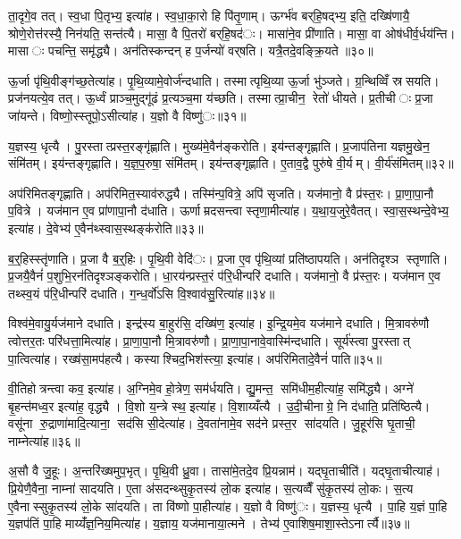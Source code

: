 ता॒दृगे॒व तत्। स्व॒धा पि॒तृभ्य॒ इत्या॑ह। स्व॒धा॒का॒रो हि पि॑तृ॒णाम्। ऊर्ग्भ॑व बर्‌हि॒षद्भ्य॒ इति॒ दख्षि॑णायै॒ श्रोणे॒रोत्त॑रस्यै॒ निन॑यति॒ सन्त॑त्यै। मासा॒ वै पि॒तरो॑ बर्‌हि॒षद॑ः। मासा॑ने॒व प्री॑णाति। मासा॒ वा ओष॑धीर्व॒र्धय॑न्ति। मासाः पचन्ति॒ समृ॑द्ध्यै। अन॑तिस्कन्दन् ह प॒र्जन्यो॑ वर्‌षति। यत्रै॒तदे॒वङ्क्रि॒यते॥३०॥

ऊ॒र्जा पृ॑थि॒वीङ्ग॑च्छ॒तेत्या॑ह। पृ॒थि॒व्यामे॒वोर्ज॑न्दधाति। तस्मात्पृथि॒व्या ऊ॒र्जा भु॑ञ्जते। ग्र॒न्थिव्विँ स्रसयति। प्रज॑नयत्ये॒व तत्। ऊ॒र्ध्वं प्राञ्च॒मुद्गू॑ढं प्र॒त्यञ्च॒मा य॑च्छति। तस्मात्प्रा॒चीन॒ रेतो॑ धीयते। प्र॒तीचीः प्र॒जा जा॑यन्ते। विष्णो॒स्स्तूपो॒ऽसीत्या॑ह। य॒ज्ञो वै विष्णु॑ः॥३१॥

य॒ज्ञस्य॒ धृत्यै। पु॒रस्तात्प्रस्त॒रङ्गृ॑ह्णाति। मुख्य॑मे॒वैन॑ङ्करोति। इय॑न्तङ्गृह्णाति। प्र॒जाप॑तिना यज्ञमु॒खेन॒ संमि॑तम्। इय॑न्तङ्गृह्णाति। य॒ज्ञ॒प॒रुषा॒ संमि॑तम्। इय॑न्तङ्गृह्णाति। ए॒ताव॒द्वै पुरु॑षे वी॒र्यम्। वी॒र्य॑संमितम्॥३२॥

अप॑रिमितङ्गृह्णाति। अप॑रिमित॒स्याव॑रुद्ध्यै। तस्मि॑न्प॒वित्रे॒ अपि॑ सृजति। यज॑मानो॒ वै प्र॑स्त॒रः। प्रा॒णा॒पा॒नौ प॒वित्रे। यज॑मान ए॒व प्रा॑णापा॒नौ द॑धाति। ऊर्णाम्रदसन्त्वा स्तृणा॒मीत्या॑ह। य॒था॒य॒जुरे॒वैतत्। स्वा॒स॒स्थन्दे॒वेभ्य॒ इत्या॑ह। दे॒वेभ्य॑ ए॒वैन॑थ्स्वास॒स्थङ्क॑रोति॥३३॥

ब॒र्॒हिस्स्तृ॑णाति। प्र॒जा वै ब॒र्॒हिः। पृ॒थि॒वी वेदि॑ः। प्र॒जा ए॒व पृ॑थि॒व्यां प्रति॑ष्ठापयति। अन॑तिदृश्ञ स्तृणाति। प्र॒जयै॒वैनं॑ प॒शुभि॒रन॑तिदृश्ञङ्करोति। धा॒रय॑न्प्रस्त॒रं प॑रि॒धीन्परि॑ दधाति। यज॑मानो॒ वै प्र॑स्त॒रः। यज॑मान ए॒व तथ्स्व॒यं प॑रि॒धीन्परि॑ दधाति। ग॒न्ध॒र्वो॑ऽसि वि॒श्वाव॑सु॒रित्या॑ह॥३४॥

विश्व॑मे॒वायु॒र्यज॑माने दधाति। इन्द्र॑स्य बा॒हुर॑सि॒ दख्षि॑ण॒ इत्या॑ह। इ॒न्द्रि॒यमे॒व यज॑माने दधाति। मि॒त्रावरु॑णौ त्वोत्तर॒तः परि॑धत्ता॒मित्या॑ह। प्रा॒णा॒पा॒नौ मि॒त्रावरु॑णौ। प्रा॒णा॒पा॒नावे॒वास्मि॑न्दधाति। सूर्य॑स्त्वा पु॒रस्तात् पा॒त्वित्या॑ह। रख्ष॑सा॒मप॑हत्यै। कस्याश्चिद॒भिश॑स्त्या॒ इत्या॑ह। अप॑रिमितादे॒वैनं॑ पाति॥३५॥

वी॒तिहोत्रन्त्वा कव॒ इत्या॑ह। अ॒ग्निमे॒व हो॒त्रेण॒ सम॑र्धयति। द्यु॒मन्त॒ समि॑धीम॒हीत्या॑ह॒ समि॑द्ध्यै। अग्ने॑ बृ॒हन्त॑मध्व॒र इत्या॑ह॒ वृद्ध्यै। वि॒शो य॒न्त्रे स्थ॒ इत्या॑ह। वि॒शाय्यँत्यै। उ॒दी॒चीनाग्रे॒ नि द॑धाति॒ प्रति॑ष्ठित्यै। वसू॑ना रु॒द्राणा॑मादि॒त्याना॒ सद॑सि सी॒देत्या॑ह। दे॒वता॑नामे॒व सद॑ने प्रस्त॒र सा॑दयति। जु॒हूर॑सि घृ॒ताची॒ नाम्नेत्या॑ह॥३६॥

अ॒सौ वै जु॒हूः। अ॒न्तरि॑ख्षमुप॒भृत्। पृ॒थि॒वी ध्रु॒वा। तासा॑मे॒तदे॒व प्रि॒यन्नाम॑। यद्घृ॒ताचीति॑। यद्घृ॒ताचीत्याह॑। प्रि॒येणै॒वैना॒ नाम्ना॑ सादयति। ए॒ता अ॑सदन्थ्सुकृ॒तस्य॑ लो॒क इत्या॑ह। स॒त्यव्वैँ सु॑कृ॒तस्य॑ लो॒कः। स॒त्य ए॒वैनास्सुकृ॒तस्य॑ लो॒के सा॑दयति। ता वि॑ष्णो पा॒हीत्या॑ह। य॒ज्ञो वै विष्णु॑ः। य॒ज्ञस्य॒ धृत्यै। पा॒हि य॒ज्ञं पा॒हि य॒ज्ञप॑तिं पा॒हि माय्यँ॑ज्ञ॒निय॒मित्या॑ह। य॒ज्ञाय॒ यज॑मानाया॒त्मने। तेभ्य॑ ए॒वाशिष॒माशा॒स्तेऽनार्त्यै॥३७॥

